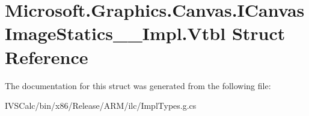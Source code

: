 \hypertarget{struct_microsoft_1_1_graphics_1_1_canvas_1_1_i_canvas_image_statics_____impl_1_1_vtbl}{}\section{Microsoft.\+Graphics.\+Canvas.\+I\+Canvas\+Image\+Statics\+\_\+\+\_\+\+Impl.\+Vtbl Struct Reference}
\label{struct_microsoft_1_1_graphics_1_1_canvas_1_1_i_canvas_image_statics_____impl_1_1_vtbl}


The documentation for this struct was generated from the following file\+:\begin{DoxyCompactItemize}
\item 
I\+V\+S\+Calc/bin/x86/\+Release/\+A\+R\+M/ilc/Impl\+Types.\+g.\+cs\end{DoxyCompactItemize}

